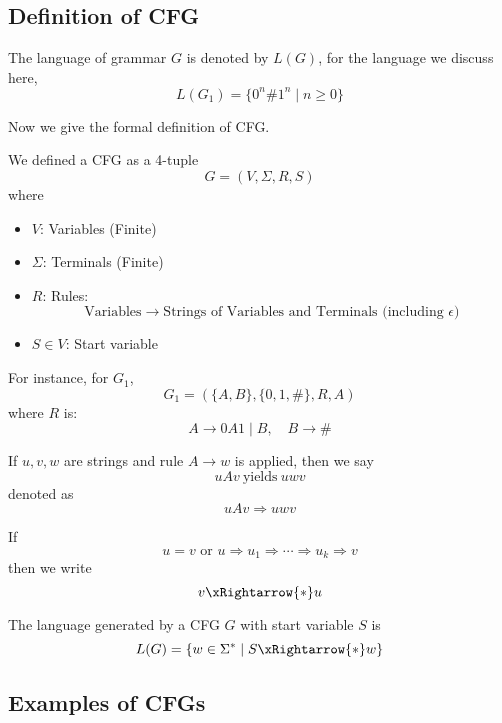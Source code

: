 \newpage

\subsection{Definition of CFG}
The language of grammar $G$ is denoted by $L(G)$, for the language we discuss here,
\[
L(G_1) = \{ 0^n \# 1^n \mid n \geq 0 \}
\]

Now we give the formal definition of CFG.
\begin{definition}
    We defined a CFG as a 4-tuple 
    \[
        G = (V, \Sigma, R, S)
    \]
    where
    \begin{itemize}
        \item $V$: Variables (Finite)
        \item $\Sigma$: Terminals (Finite)
        \item $R$: Rules:
        \[
            \text{Variables} \to \text{Strings of Variables and Terminals (including $\epsilon$)}
        \]
        \item $S \in V$: Start variable
    \end{itemize}
\end{definition}

For instance, for $G_1$,
\[
G_1 = (\{A, B\}, \{0, 1, \#\}, R, A)
\]
where $R$ is:
\[
    A \to 0A1 \mid B, \quad B \to \#
\]

\begin{notation}
    If $u, v, w$ are strings and rule $A \to w$ is applied, then we say
    \[
    uAv \ \text{yields}\ uwv
    \]
    denoted as
    \[
    uAv \Rightarrow uwv
    \]
\end{notation}

\begin{notation}
    If \[
    u = v \text{ or } u \Rightarrow u_1 \Rightarrow \cdots \Rightarrow u_k \Rightarrow v
    \] then we write
    \[
    v \xRightarrow{*} u
    \]
\end{notation}

\begin{definition}
    The language generated by a CFG $G$ with start variable $S$ is
    \[
    L(G) = \{ w \in \Sigma^* \mid S \xRightarrow{*} w \}
    \]
\end{definition}

\newpage

\subsection{Examples of CFGs}

